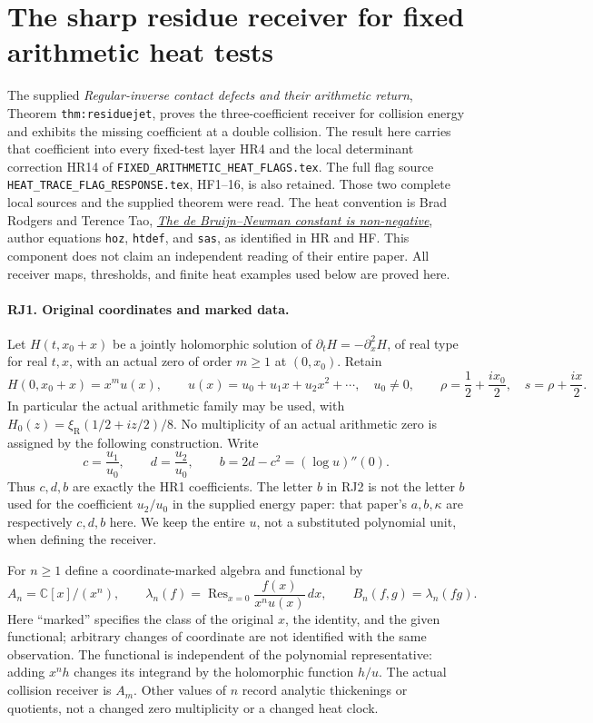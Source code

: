 \section{The sharp residue receiver for fixed arithmetic heat tests}
\label{sec:residue-fixed-receiver}

The supplied \emph{Regular-inverse contact defects and their arithmetic
return}, Theorem \texttt{thm:residuejet}, proves the three-coefficient
receiver for collision energy and exhibits the missing coefficient at a
double collision. The result here carries that coefficient into every
fixed-test layer HR4 and the local determinant correction HR14 of
\texttt{FIXED\_ARITHMETIC\_HEAT\_FLAGS.tex}. The full flag source
\texttt{HEAT\_TRACE\_FLAG\_RESPONSE.tex}, HF1--16, is also retained.
Those two complete local sources and the supplied theorem were read.
The heat convention is Brad Rodgers and Terence Tao,
\href{https://arxiv.org/abs/1801.05914v5}{\emph{The de Bruijn--Newman
constant is non-negative}}, author equations \texttt{hoz},
\texttt{htdef}, and \texttt{sas}, as identified in HR and HF. This
component does not claim an independent reading of their entire paper.
All receiver maps, thresholds, and finite heat examples used below are
proved here.

\paragraph{RJ1. Original coordinates and marked data.}
Let $H(t,x_0+x)$ be a jointly holomorphic solution of
$\partial_tH=-\partial_x^2H$, of real type for real $t,x$, with an
actual zero of order $m\ge1$ at $(0,x_0)$. Retain
\[
 H(0,x_0+x)=x^m u(x),\qquad
 u(x)=u_0+u_1x+u_2x^2+\cdots,\quad u_0\ne0,
 \qquad \rho=\frac12+\frac{ix_0}{2},\quad s=\rho+\frac{ix}{2}.
 \tag{RJ1}
\]
In particular the actual arithmetic family may be used, with
$H_0(z)=\xi_{\mathrm R}(1/2+iz/2)/8$. No multiplicity of an
actual arithmetic zero is assigned by the following construction.
Write
\[
 c=\frac{u_1}{u_0},\qquad d=\frac{u_2}{u_0},\qquad
 b=2d-c^2=(\log u)''(0).
 \tag{RJ2}
\]
Thus $c,d,b$ are exactly the HR1 coefficients. The letter $b$ in
RJ2 is not the letter $b$ used for the coefficient $u_2/u_0$ in the
supplied energy paper: that paper's $a,b,\kappa$ are respectively
$c,d,b$ here. We keep the entire $u$, not a substituted polynomial
unit, when defining the receiver.

For $n\ge1$ define a coordinate-marked algebra and functional by
\[
 A_n=\mathbb C[x]/(x^n),\qquad
 \lambda_n(f)=\operatorname{Res}_{x=0}
          \frac{f(x)}{x^n u(x)}\,dx,\qquad
 B_n(f,g)=\lambda_n(fg).
 \tag{RJ3}
\]
Here ``marked'' specifies the class of the original $x$, the identity,
and the given functional; arbitrary changes of coordinate are not
identified with the same observation. The functional is independent
of the polynomial representative: adding $x^nh$ changes its integrand
by the holomorphic function $h/u$. The actual collision receiver is
$A_m$. Other values of $n$ record analytic thickenings or quotients,
not a changed zero multiplicity or a changed heat clock.

